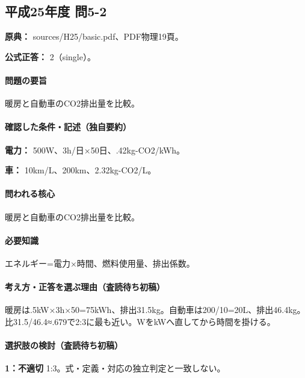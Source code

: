 \subsection{平成25年度 問5-2}
\label{q:h25-reg-basic-5-2}

\noindent\textbf{原典：} sources/H25/basic.pdf、PDF物理19頁。

\textbf{公式正答：} 2（single）。

\paragraph{問題の要旨} 暖房と自動車のCO2排出量を比較。

\paragraph{確認した条件・記述（独自要約）}\mbox{}\par

\noindent\textbf{電力：} 500W、3h/日×50日、.42kg-CO2/kWh。\par

\noindent\textbf{車：} 10km/L、200km、2.32kg-CO2/L。\par

\paragraph{問われる核心} 暖房と自動車のCO2排出量を比較。

\paragraph{必要知識} エネルギー=電力×時間、燃料使用量、排出係数。

\paragraph{考え方・正答を選ぶ理由（査読待ち初稿）} 暖房は.5kW×3h×50=\allowbreak{}75kWh、排出31.5kg。自動車は200/10=\allowbreak{}20L、排出46.4kg。比31.5/46.4≈.679で2:3に最も近い。WをkWへ直してから時間を掛ける。

\paragraph{選択肢の検討（査読待ち初稿）}\mbox{}\par

\noindent\textbf{1：不適切} 1:3。式・定義・対応の独立判定と一致しない。\par

